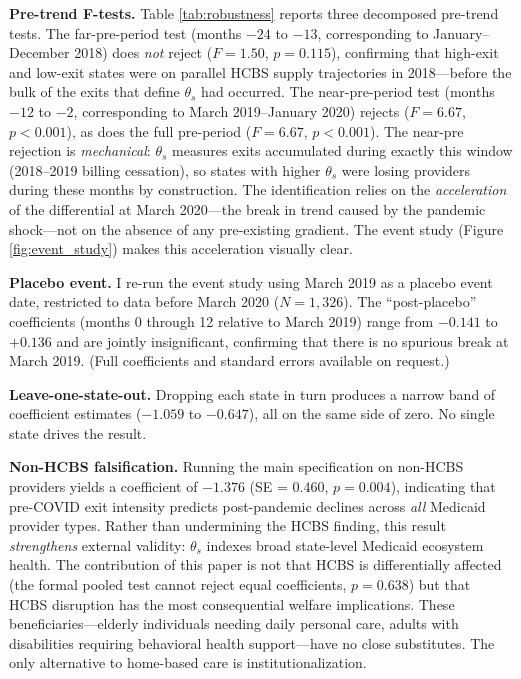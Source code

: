 \documentclass[12pt]{article}
\begin{document}
\textbf{Pre-trend F-tests.} Table \ref{tab:robustness} reports three decomposed pre-trend tests. The far-pre-period test (months $-24$ to $-13$, corresponding to January--December 2018) does \emph{not} reject ($F = 1.50$, $p = 0.115$), confirming that high-exit and low-exit states were on parallel HCBS supply trajectories in 2018---before the bulk of the exits that define $\theta_s$ had occurred. The near-pre-period test (months $-12$ to $-2$, corresponding to March 2019--January 2020) rejects ($F = 6.67$, $p < 0.001$), as does the full pre-period ($F = 6.67$, $p < 0.001$). The near-pre rejection is \emph{mechanical}: $\theta_s$ measures exits accumulated during exactly this window (2018--2019 billing cessation), so states with higher $\theta_s$ were losing providers during these months by construction. The identification relies on the \emph{acceleration} of the differential at March 2020---the break in trend caused by the pandemic shock---not on the absence of any pre-existing gradient. The event study (Figure \ref{fig:event_study}) makes this acceleration visually clear.

\textbf{Placebo event.} I re-run the event study using March 2019 as a placebo event date, restricted to data before March 2020 ($N = 1{,}326$). The ``post-placebo'' coefficients (months 0 through 12 relative to March 2019) range from $-0.141$ to $+0.136$ and are jointly insignificant, confirming that there is no spurious break at March 2019. (Full coefficients and standard errors available on request.)

\textbf{Leave-one-state-out.} Dropping each state in turn produces a narrow band of coefficient estimates ($-1.059$ to $-0.647$), all on the same side of zero. No single state drives the result.

\textbf{Non-HCBS falsification.} Running the main specification on non-HCBS providers yields a coefficient of $-1.376$ (SE = 0.460, $p = 0.004$), indicating that pre-COVID exit intensity predicts post-pandemic declines across \emph{all} Medicaid provider types. Rather than undermining the HCBS finding, this result \emph{strengthens} external validity: $\theta_s$ indexes broad state-level Medicaid ecosystem health. The contribution of this paper is not that HCBS is differentially affected (the formal pooled test cannot reject equal coefficients, $p = 0.638$) but that HCBS disruption has the most consequential welfare implications. These beneficiaries---elderly individuals needing daily personal care, adults with disabilities requiring behavioral health support---have no close substitutes. The only alternative to home-based care is institutionalization.
\end{document}
